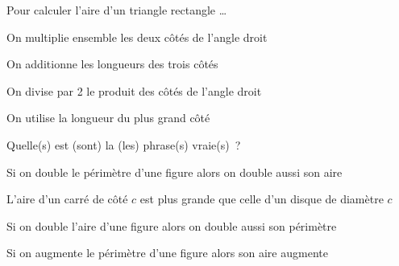 \begin{QCM}
  \begin{GroupeQCM}
 
    
    \begin{exercice}
      Pour calculer l'aire d'un triangle rectangle \ldots
      \begin{ChoixQCM}{4}
      \item On multiplie ensemble les deux côtés de l'angle droit
      \item On additionne les longueurs des trois côtés
      \item On divise par 2 le produit des côtés de l'angle droit
      \item On utilise la longueur du plus grand côté
      \end{ChoixQCM}
\begin{corrige}
   \end{corrige}
    \end{exercice}
    
    
    \begin{exercice}
      Quelle(s) est (sont) la (les) phrase(s) vraie(s) ?
      \begin{ChoixQCM}{4}
      \item Si on double le périmètre d'une figure alors on double aussi son aire
      \item L'aire d'un carré de côté $c$ est plus grande que celle d'un disque de diamètre $c$
      \item Si on double l'aire d'une figure alors on double aussi son périmètre
      \item Si on augmente le périmètre d'une figure alors son aire augmente
      \end{ChoixQCM}
\begin{corrige}
   \end{corrige}
    \end{exercice}

\end{GroupeQCM}
\end{QCM}

  
